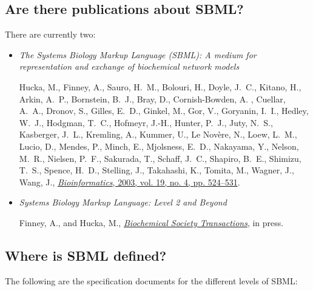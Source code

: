 \documentclass{sbmlfaq}
\begin{document}
\subsection{Are there publications about SBML?}

There are currently two:

\begin{itemize}
  
\item \emph{The Systems Biology Markup Language (SBML): A
    medium for representation and exchange of biochemical network
    models}
    
    Hucka, M., Finney, A., Sauro, H.~M., Bolouri, H., Doyle, J.~C., Kitano,
    H., Arkin, A.~P., Bornstein, B.~J., Bray, D., Cornish-Bowden, A. ,
    Cuellar, A.~A., Dronov, S., Gilles, E.~D., Ginkel, M., Gor, V.,
    Goryanin, I.~I., Hedley, W.~J., Hodgman, T.~C., Hofmeyr, J.-H., Hunter,
    P.~J., Juty, N.~S., Kasberger, J.~L., Kremling, A., Kummer, U., Le
    Nov\`{e}re, N., Loew, L.~M., Lucio, D., Mendes, P., Minch, E.,
    Mjolsness, E.~D., Nakayama, Y., Nelson, M.~R., Nielsen, P.~F.,
    Sakurada, T., Schaff, J.~C., Shapiro, B.~E., Shimizu, T.~S., Spence,
    H.~D., Stelling, J., Takahashi, K., Tomita, M., Wagner, J., Wang, J.,
    \href{http://bioinformatics.oupjournals.org/cgi/reprint/19/4/524?ijkey=BzZTZ.dDZEXp0U&keytype=ref&siteid=bioinfo}{\emph{Bioinformatics},
      2003, vol. 19, no. 4, pp. 524--531}.

\item \emph{Systems Biology Markup Language: Level 2 and Beyond}

    Finney, A., and Hucka, M.,
    \href{http://www.biochemsoctrans.org/}{\emph{Biochemical Society
        Transactions}}, in press.

\end{itemize}



\subsection{Where is SBML defined?}
\label{sec:spec-docs}
The following are the specification documents for the different levels of
SBML:
\end{document}
